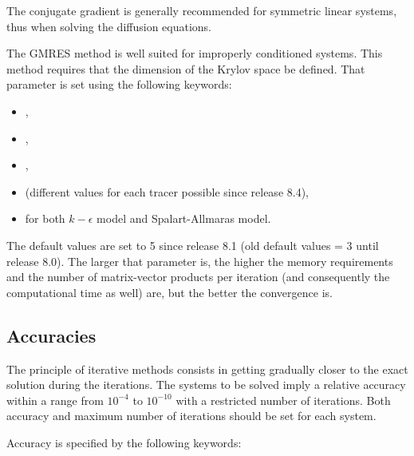 The conjugate gradient is generally recommended for symmetric linear systems,
thus when solving the diffusion equations.

The GMRES method is well suited for improperly conditioned systems. This method
requires that the dimension of the Krylov space be defined. That parameter is
set using the following keywords:

\begin{itemize}
\item {},

\item {},

\item {},

\item {}
(different values for each tracer possible since release 8.4),

\item {}
for both $k-\epsilon$ model and Spalart-Allmaras model.
\end{itemize}

The default values are set to 5 since release 8.1 (old default values
= 3 until release 8.0). The larger that parameter is, the higher the
memory requirements and the number of matrix-vector products per iteration (and
consequently the computational time as well) are, but the better the
convergence is.

\subsection{Accuracies}
\label{sec:accuracy}
The principle of iterative methods consists in getting gradually closer to the
exact solution during the iterations. The systems to be solved imply a relative
accuracy within a range from $10^{-4}$ to $10^{-10}$ with a restricted
number of iterations. Both accuracy and maximum number of iterations should be
set for each system.

Accuracy is specified by the following keywords:

